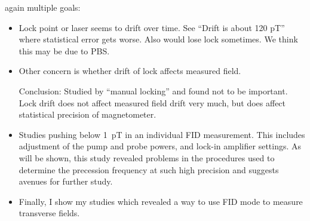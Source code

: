 again multiple goals:
 \begin{itemize}
   \item Lock point or laser seems to drift over time.  See ``Drift
    is about 120 pT'' where statistical error gets worse.  Also
     would lose lock sometimes.  We think this may be due to PBS.
    \item Other concern is whether drift of lock affects measured
     field.  
     
     Conclusion: Studied by ``manual locking'' and found not to be
     important.  Lock drift does not affect measured field drift very
    much, but does affect statistical precision of magnetometer.
\item Studies pushing below 1~pT in an individual FID measurement.
  This includes adjustment of the pump and probe powers, and lock-in
  amplifier settings.  As will be shown, this study revealed problems
  in the procedures used to determine the precession frequency at such
  high precision and suggests avenues for further study.
\item Finally, I show my studies which revealed a way to use FID mode
  to measure transverse fields.
\end{itemize}
